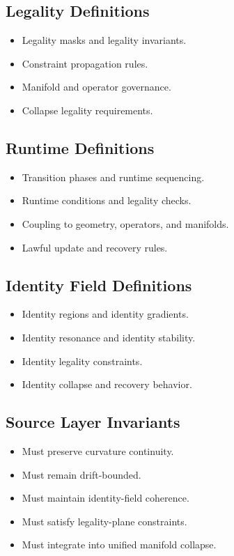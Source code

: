 \subsection{Legality Definitions}
\begin{itemize}
    \item Legality masks and legality invariants.
    \item Constraint propagation rules.
    \item Manifold and operator governance.
    \item Collapse legality requirements.
\end{itemize}

\subsection{Runtime Definitions}
\begin{itemize}
    \item Transition phases and runtime sequencing.
    \item Runtime conditions and legality checks.
    \item Coupling to geometry, operators, and manifolds.
    \item Lawful update and recovery rules.
\end{itemize}

\subsection{Identity Field Definitions}
\begin{itemize}
    \item Identity regions and identity gradients.
    \item Identity resonance and identity stability.
    \item Identity legality constraints.
    \item Identity collapse and recovery behavior.
\end{itemize}

\subsection{Source Layer Invariants}
\begin{itemize}
    \item Must preserve curvature continuity.
    \item Must remain drift-bounded.
    \item Must maintain identity-field coherence.
    \item Must satisfy legality-plane constraints.
    \item Must integrate into unified manifold collapse.
\end{itemize}
